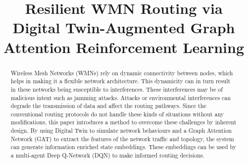\documentclass[conference]{IEEEtran}
\begin{document}
\title{Resilient WMN Routing via Digital Twin-Augmented Graph Attention Reinforcement Learning}

\author{
  \and
  \and
}

\maketitle

\begin{abstract}
Wireless Mesh Networks (WMNs) rely on dynamic connectivity between nodes, which helps in making it a flexible network architecture. This dynamicity can in turn result in these networks being susceptible to interferences. These interferences may be of malicious intent such as jamming attacks. Attacks or environmental interferences can degrade the transmission of data and affect the routing pathways. Since the conventional routing protocols do not handle these kinds of situations without any modifications, this paper introduces a method to overcome these challenges by inherent design. By using Digital Twin to simulate network behaviours and a Graph Attention Network (GAT) to extract the features of the network traffic and topology, the system can generate information enriched state embeddings. These embeddings can be used by a multi-agent Deep Q-Network (DQN) to make informed routing decisions.
\end{abstract}
\end{document}
